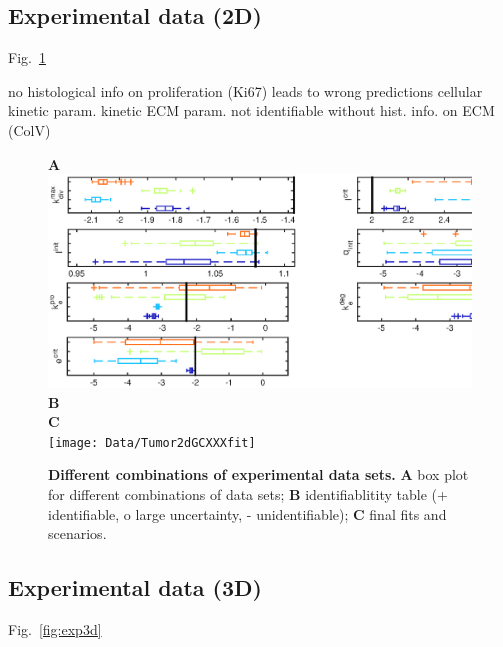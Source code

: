 \documentclass[10pt,letterpaper]{article}
\begin{document}
\subsection*{Experimental data (2D)}
Fig.~\ref{fig:exp2d} 

no histological info on proliferation (Ki67) leads to wrong predictions cellular kinetic param.
kinetic ECM param. not identifiable without hist. info. on ECM (ColV)


\begin{figure}[htbp]
\textbf{A}\\
\includegraphics[width=\textwidth]{Data/Tumor2dGCXXXindependentBoxplots}\\
\textbf{B}\\


\textbf{C}\\
\texttt{[image: Data/Tumor2dGCXXXfit]}
\caption{{\bf Different combinations of experimental data sets.}
\textbf{A} box plot for different combinations of data sets; \textbf{B} identifiablitity table (+ identifiable, o large uncertainty, - unidentifiable); \textbf{C} final fits and scenarios.}
\label{fig:exp2d}
\end{figure}

\subsection*{Experimental data (3D)}
Fig.~\ref{fig:exp3d} 
\end{document}
